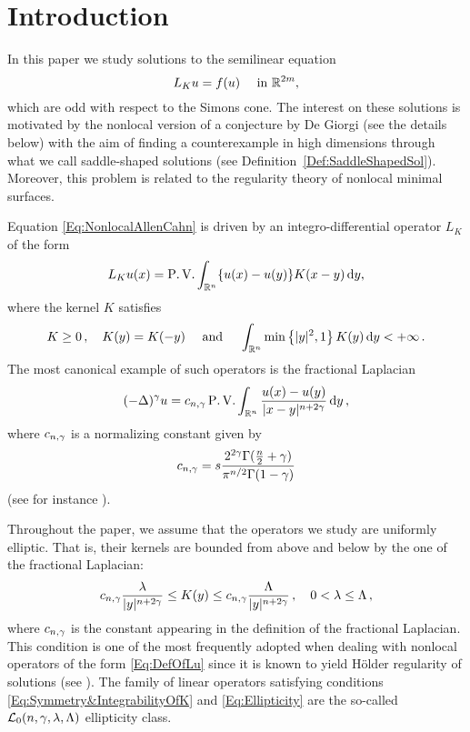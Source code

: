 \section{Introduction}
\label{Sec:Introduction}

In this paper we study solutions to the semilinear equation
\begin{equation}
\label{Eq:NonlocalAllenCahn}
L_K u = f(u) \quad \textrm{ in } \mathbb{R}^{2m},
\end{equation}
which are odd with respect to the Simons cone. The interest on these solutions is motivated by the nonlocal version of a conjecture by De Giorgi (see the details below) with the aim of finding a counterexample in high dimensions through what we call saddle-shaped solutions (see Definition~\ref{Def:SaddleShapedSol}). Moreover, this problem is related to the regularity theory of nonlocal minimal surfaces.

Equation \eqref{Eq:NonlocalAllenCahn} is driven by an integro-differential operator $L_K$ of the form
\begin{equation}
\label{Eq:DefOfLu}
L_Ku(x) = \operatorname{P.V.} \int_{\mathbb{R}^n} \{u(x) - u(y)\} K(x-y)\,\mathrm{d} y,
\end{equation}
where the kernel $K$ satisfies
\begin{equation}
\label{Eq:Symmetry&IntegrabilityOfK}
K\geq 0\,, \quad K(y) = K(-y) \quad \textrm{ and } \quad \int_{\mathbb{R}^n} \min \left\{ |y|^2, 1 \right\} K(y) \,\mathrm{d} y < + \infty\,.
\end{equation}
The most canonical example of such operators is the fractional Laplacian
$$
(-\Delta)^\gamma u = c_{n, \gamma} \operatorname{P.V.} \int_{\mathbb{R}^n} \dfrac{u(x) - u(y)}{|x-y|^{n + 2\gamma}}\,\mathrm{d} y\,,
$$
where $c_{n, \gamma}$ is a normalizing constant given by
\begin{equation}
	\label{Eq:ConstantFracLaplacian}
	c_{n,\gamma} = s\dfrac{2^{2\gamma} \Gamma(\frac{n}{2}+\gamma) }{\pi^{n/2} \Gamma(1-\gamma)}
\end{equation}
(see for instance \cite{BucurValdinoci}).

Throughout the paper, we assume that the operators we study are uniformly elliptic. That is, their kernels are bounded from above and below by the one of the fractional Laplacian:
\begin{equation}
\label{Eq:Ellipticity}
c_{n,\gamma}\dfrac{\lambda}{|y|^{n+2\gamma}} \leq K(y) \leq c_{n,\gamma}\dfrac{\Lambda}{|y|^{n+2\gamma}}\,, \quad 0< \lambda \leq \Lambda \,,
\end{equation}
where $c_{n,\gamma}$ is the constant appearing in the definition of the fractional Laplacian. This condition is one of the most frequently adopted when dealing with nonlocal operators of the form \eqref{Eq:DefOfLu} since it is known to yield Hölder regularity of solutions (see \cite{RosOton-Survey,SerraC2s+alphaRegularity}). The family of linear operators satisfying conditions \eqref{Eq:Symmetry&IntegrabilityOfK} and \eqref{Eq:Ellipticity} are the so-called $\mathcal{L}_0(n,\gamma,\lambda, \Lambda)$ ellipticity class.

